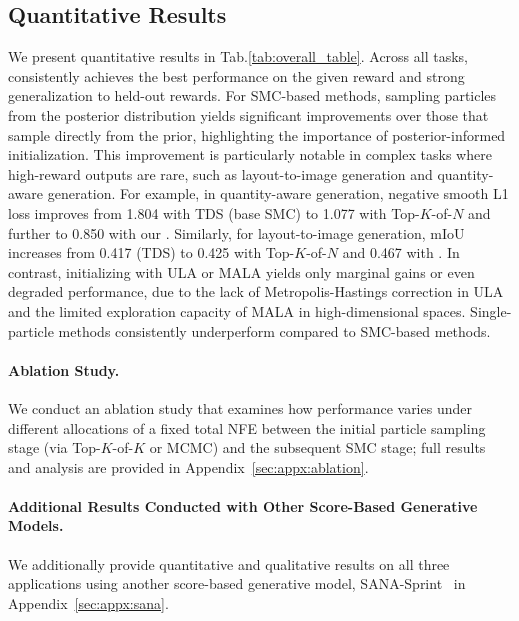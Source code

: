 

\subsection{Quantitative Results}
\vspace{-0.1cm}
We present quantitative results in Tab.\ref{tab:overall_table}. Across all tasks, \methodname{} consistently achieves the best performance on the given reward and strong generalization to held-out rewards. For SMC-based methods, sampling particles from the posterior distribution yields significant improvements over those that sample directly from the prior, highlighting the importance of posterior-informed initialization. This improvement is particularly notable in complex tasks where high-reward outputs are rare, such as layout-to-image generation and quantity-aware generation. For example, in quantity-aware generation, negative smooth L1 loss improves from 1.804 with TDS (base SMC) to 1.077 with Top-$K$-of-$N$ and further to 0.850 with our \methodname{}. Similarly, for layout-to-image generation, mIoU increases from 0.417 (TDS) to 0.425 with Top-$K$-of-$N$ and 0.467 with \methodname{}.
% 
In contrast, initializing with ULA or MALA yields only marginal gains or even degraded performance, due to the lack of Metropolis-Hastings correction in ULA and the limited exploration capacity of MALA in high-dimensional spaces. Single-particle methods consistently underperform compared to SMC-based methods.
\vspace{-0.3cm}
\paragraph{Ablation Study.} We conduct an ablation study that examines how performance varies under different allocations of a fixed total NFE between the initial particle sampling stage (via Top-$K$-of-$K$ or MCMC) and the subsequent SMC stage; full results and analysis are provided in Appendix~\ref{sec:appx:ablation}.
\vspace{-0.2cm}
\paragraph{Additional Results Conducted with Other Score-Based Generative Models.} We additionally provide quantitative and qualitative results on all three applications using another score-based generative model, SANA-Sprint~\cite{chen2025sanasprint} in Appendix~\ref{sec:appx:sana}.
\clearpage

\vspace{-0.4cm}
